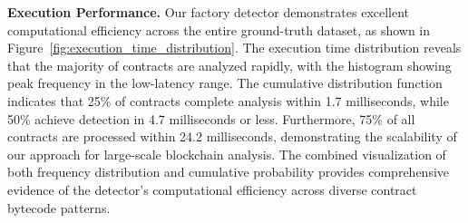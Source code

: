 \textbf{Execution Performance.} Our factory detector demonstrates excellent computational efficiency across the entire ground-truth dataset, as shown in Figure~\ref{fig:execution_time_distribution}. The execution time distribution reveals that the majority of contracts are analyzed rapidly, with the histogram showing peak frequency in the low-latency range. The cumulative distribution function indicates that 25\% of contracts complete analysis within 1.7 milliseconds, while 50\% achieve detection in 4.7 milliseconds or less. Furthermore, 75\% of all contracts are processed within 24.2 milliseconds, demonstrating the scalability of our approach for large-scale blockchain analysis. The combined visualization of both frequency distribution and cumulative probability provides comprehensive evidence of the detector's computational efficiency across diverse contract bytecode patterns.